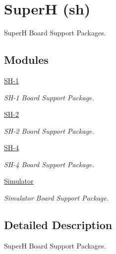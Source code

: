 \hypertarget{group__RTEMSBSPsSH}{}\section{SuperH (sh)}
\label{group__RTEMSBSPsSH}


SuperH Board Support Packages.  


\subsection*{Modules}
\begin{DoxyCompactItemize}
\item 
\mbox{\hyperlink{group__RTEMSBSPsSH1}{S\+H-\/1}}
\begin{DoxyCompactList}\small\item\em S\+H-\/1 Board Support Package. \end{DoxyCompactList}\item 
\mbox{\hyperlink{group__RTEMSBSPsSH2}{S\+H-\/2}}
\begin{DoxyCompactList}\small\item\em S\+H-\/2 Board Support Package. \end{DoxyCompactList}\item 
\mbox{\hyperlink{group__RTEMSBSPsSH4}{S\+H-\/4}}
\begin{DoxyCompactList}\small\item\em S\+H-\/4 Board Support Package. \end{DoxyCompactList}\item 
\mbox{\hyperlink{group__RTEMSBSPsSHSim}{Simulator}}
\begin{DoxyCompactList}\small\item\em Simulator Board Support Package. \end{DoxyCompactList}\end{DoxyCompactItemize}


\subsection{Detailed Description}
SuperH Board Support Packages. 

